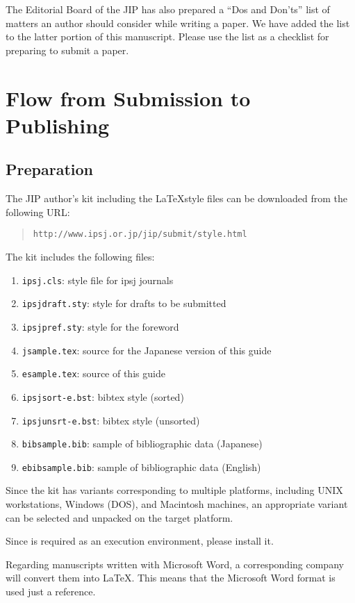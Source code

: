 \documentclass[techrep,english]{ipsj}
\def\|{\verb|}
\begin{document}
The Editorial Board of the JIP has also prepared a ``Dos and Don'ts''
list of matters an author should consider while writing a paper.  We
have added the list to the latter portion of this manuscript.  Please
use the list as a checklist for preparing to submit a paper.

%2
\section{Flow from Submission to Publishing}
%2.1
\subsection{Preparation}

The JIP author's kit including the \LaTeX style files can be downloaded
from the following URL:
\begin{quote}
 \small
 \|http://www.ipsj.or.jp/jip/submit/style.html|
\end{quote}
The kit includes the following files:
\begin{enumerate}%
\item \|ipsj.cls|: style file for ipsj journals
\item \|ipsjdraft.sty|: style for drafts to be submitted
\item \|ipsjpref.sty|: style for the foreword
\item \|jsample.tex|: source for the Japanese version of this guide
\item \|esample.tex|: source of this guide
\item \|ipsjsort-e.bst|: bibtex style (sorted)
\item \|ipsjunsrt-e.bst|: bibtex style (unsorted)
\item \|bibsample.bib|: sample of bibliographic data (Japanese)
\item \|ebibsample.bib|: sample of bibliographic data (English)
\end{enumerate}%

Since the kit has variants corresponding to multiple platforms,
including UNIX workstations, Windows (DOS), and Macintosh machines, an
appropriate variant can be selected and unpacked on the target
platform. 

Since {\LaTeXe} is required as an execution environment, please install
it.

Regarding manuscripts written with Microsoft Word, a corresponding
company will convert them into \LaTeX\@.  This means that the Microsoft
Word format is used just a reference.
\end{document}
